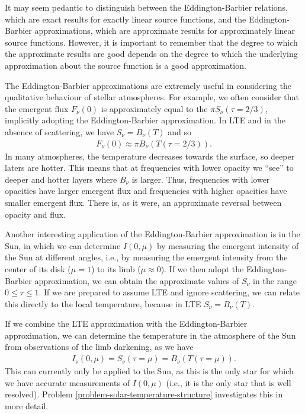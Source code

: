 It may seem pedantic to distinguish between the
Eddington-Barbier relations, which are exact results for exactly linear source functions, and
the Eddington-Barbier approximations, which are approximate results for approximately linear source functions.
However, it is important to remember that the degree to which 
the approximate results are good
depends on the degree to which the underlying approximation about the source function is a
good approximation.

The Eddington-Barbier approximations are
extremely useful in considering the qualitative behaviour of
stellar atmospheres. For example, we often consider that the emergent flux $F_\nu(0)$ is approximately equal to the $\pi S_\nu(\tau = 2/3)$, implicitly adopting the Eddington-Barbier approximation. In LTE and in the absence of scattering, we have $S_\nu = B_\nu(T)$ and so 
\begin{align}
F_\nu(0) \approx \pi B_\nu(T(\tau = 2/3)).
\end{align}
In many atmospheres, the temperature decreases towards the surface, so deeper laters are hotter. This means that at frequencies with lower opacity we “see” to deeper and hotter layers where $B_\nu$ is larger. Thus, frequencies with lower opacities have larger emergent flux and frequencies with higher opacities have smaller emergent flux. There is, as it were, an approximate reversal between opacity and flux.

Another interesting application of the Eddington-Barbier approximation is in the Sun, in which we can determine
$I(0,\mu)$ by measuring the emergent intensity of the Sun at
different angles, i.e., by measuring the emergent intensity
from the center of its disk ($\mu = 1$) to its limb ($\mu
\approx 0$). If we then adopt the Eddington-Barbier
approximation, we can obtain the approximate values of
$S_\nu$ in the range $0 \le
\tau \le 1$. If we are prepared to assume LTE and ignore scattering, we can
relate this directly to the local temperature, because in
LTE $S_\nu = B_\nu(T)$.

If we combine the LTE approximation with the
Eddington-Barbier approximation, we can determine the
temperature in the atmosphere of the Sun from observations
of the limb darkening, as we have
\begin{align}
I_\nu(0,\mu) = S_\nu(\tau = \mu) = B_\nu(T(\tau = \mu)).
\end{align}
This can currently only be applied to the Sun, as this is
the only star for which we have accurate measurements of
$I(0,\mu)$ (i.e., it is the only star that is well
resolved). Problem \ref{problem-solar-temperature-structure}
investigates this in more detail.

